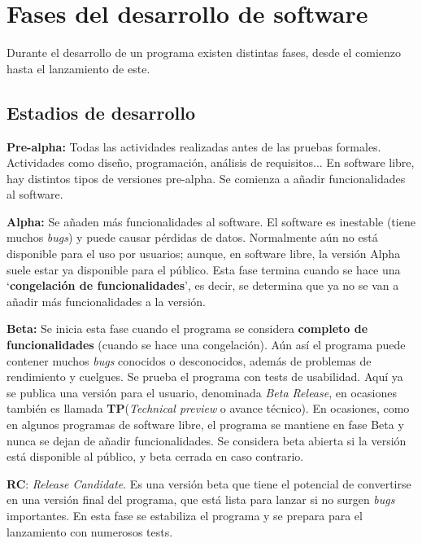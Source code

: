 \documentclass[a4paper, 11pt]{report} %
\begin{document}
\newpage
\section{Fases del desarrollo de software}
Durante el desarrollo de un programa existen distintas fases, desde el comienzo hasta el lanzamiento de este.
\subsection{Estadios de desarrollo}
\begin{description}
\item \textbf{Pre-alpha:} Todas las actividades realizadas antes de las pruebas formales. Actividades como diseño, programación, análisis de requisitos... En software libre, hay distintos tipos de versiones pre-alpha. Se comienza a añadir funcionalidades al software.
\item \textbf{Alpha:} Se añaden más funcionalidades al software. El software es inestable (tiene muchos \textit{bugs}) y puede causar pérdidas de datos. Normalmente aún no está disponible para el uso por usuarios; aunque, en software libre, la versión Alpha suele estar ya disponible para el público. Esta fase termina cuando se hace una `\textbf{congelación de funcionalidades}', es decir, se determina que ya no se van a añadir más funcionalidades a la versión.
\item \textbf{Beta:} Se inicia esta fase cuando el programa se considera \textbf{completo de funcionalidades} (cuando se hace una congelación). Aún así el programa puede contener muchos \textit{bugs} conocidos o desconocidos, además de problemas de rendimiento y cuelgues. Se prueba el programa con tests de usabilidad.
Aquí ya se publica una versión para el usuario, denominada \textit{Beta Release}, en ocasiones también es llamada \textbf{TP}(\textit{Technical preview} o avance técnico). En ocasiones, como en algunos programas de software libre, el programa se mantiene en fase Beta y nunca se dejan de añadir funcionalidades. Se considera beta abierta si la versión está disponible al público, y beta cerrada en caso contrario.
\item \textbf{RC}: \textit{Release Candidate}. Es una versión beta que tiene el potencial de convertirse en una versión final del programa, que está lista para lanzar si no surgen \textit{bugs} importantes. En esta fase se estabiliza el programa y se prepara para el lanzamiento con numerosos tests.
\end{description}
\end{document}
